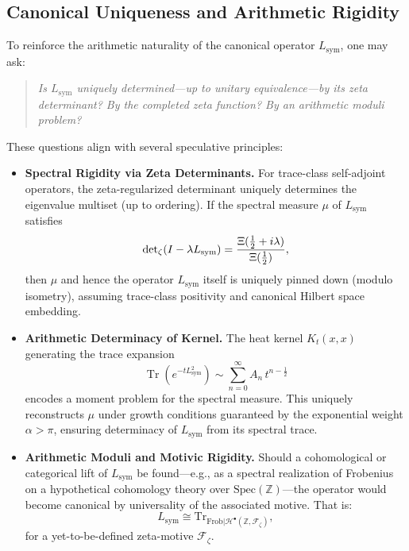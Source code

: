 \subsection*{Canonical Uniqueness and Arithmetic Rigidity}

To reinforce the arithmetic naturality of the canonical operator \( L_{\mathrm{sym}} \), one may ask:

\begin{quote}
\emph{Is \( L_{\mathrm{sym}} \) uniquely determined—up to unitary equivalence—by its zeta determinant? By the completed zeta function? By an arithmetic moduli problem?}
\end{quote}

These questions align with several speculative principles:

\begin{itemize}
  \item \textbf{Spectral Rigidity via Zeta Determinants.}  
  For trace-class self-adjoint operators, the zeta-regularized determinant uniquely determines the eigenvalue multiset (up to ordering). If the spectral measure \( \mu \) of \( L_{\mathrm{sym}} \) satisfies
  \[
  \det\nolimits_{\zeta}(I - \lambda L_{\mathrm{sym}}) = \frac{\Xi(\tfrac{1}{2} + i\lambda)}{\Xi(\tfrac{1}{2})},
  \]
  then \( \mu \) and hence the operator \( L_{\mathrm{sym}} \) itself is uniquely pinned down (modulo isometry), assuming trace-class positivity and canonical Hilbert space embedding.

  \item \textbf{Arithmetic Determinacy of Kernel.}  
  The heat kernel \( K_t(x,x) \) generating the trace expansion
  \[
  \operatorname{Tr}(e^{-t L_{\mathrm{sym}}^2}) \sim \sum_{n=0}^\infty A_n\, t^{n - \frac{1}{2}}
  \]
  encodes a moment problem for the spectral measure. This uniquely reconstructs \( \mu \) under growth conditions guaranteed by the exponential weight \( \alpha > \pi \), ensuring determinacy of \( L_{\mathrm{sym}} \) from its spectral trace.

  \item \textbf{Arithmetic Moduli and Motivic Rigidity.}  
  Should a cohomological or categorical lift of \( L_{\mathrm{sym}} \) be found—e.g., as a spectral realization of Frobenius on a hypothetical cohomology theory over \( \mathrm{Spec}(\mathbb{Z}) \)—the operator would become canonical by universality of the associated motive. That is:
  \[
  L_{\mathrm{sym}} \cong \mathrm{Tr}_{\text{Frob} | \mathcal{H}^\bullet(\mathbb{Z}, \mathcal{F}_\zeta)},
  \]
  for a yet-to-be-defined zeta-motive \( \mathcal{F}_\zeta \).
\end{itemize}

